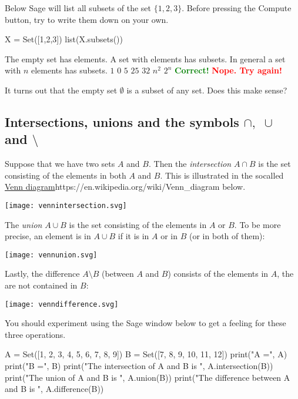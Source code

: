 \documentclass{article}
\newcommand{\red}[1]{\textcolor{red}{\textbf{#1}}}
\newcommand{\green}[1]{\textcolor{green}{\textbf{#1}}}
\begin{document}
Below Sage will list all subsets of the set $\{1, 2, 3\}$. Before pressing
the Compute button, try to write them down on your own.

\begin{sage}
X = Set([1,2,3])
list(X.subsets())
\end{sage}


\begin{quizexercise}[showhide]
\begin{paraquiz}
  \question
  The empty set has \box elements. A set with \box elements has \box subsets. In general a set with
  $n$ elements has \box subsets.
  \answer
  $1$
  \answer
  $0$
  \answer
  $5$
  \answer
  $25$
  \answer
  $32$
  \answer
  $n^2$
  \answer
  $2^n$
  \green{Correct!}
  \red{Nope. Try again!}
\end{paraquiz}
\end{quizexercise}


It turns out that the empty set $\emptyset$ is a subset of any set. Does this
make sense?

\subsection{Intersections, unions and the symbols $\cap,\,\, \cup$ and $\setminus$}

Suppose that we have two sets $A$ and $B$. Then the \emph{intersection} $A\cap B$ is the
set consisting of the elements in both $A$ and $B$. This is illustrated in the
socalled \url{Venn diagram}{https://en.wikipedia.org/wiki/Venn_diagram} below.

\texttt{[image: vennintersection.svg]}

The \emph{union} $A\cup B$ is the
set consisting of the elements in $A$ or $B$. To be more precise, an element is in
$A\cup B$ if it is in $A$ or in $B$ (or in both of them):

\texttt{[image: vennunion.svg]}

Lastly, the
difference $A\setminus B$ (between $A$ and $B$) consists of the elements
in $A$, the are not contained in $B$:

\texttt{[image: venndifference.svg]}

You should experiment using the Sage window below to get a feeling for these three operations.

\begin{sage}
A = Set([1, 2, 3, 4, 5, 6, 7, 8, 9])
B = Set([7, 8, 9, 10, 11, 12])
print("A =", A)
print("B =", B)
print("The intersection of A and B is ", A.intersection(B))
print("The union of A and B is ", A.union(B))
print("The difference between A and B is ", A.difference(B))
\end{sage}
\end{document}
